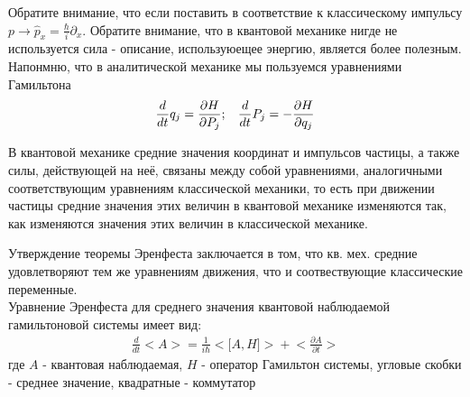 Обратите внимание, что если поставить в соответствие к классическому импульсу $p \rightarrow \widehat{p}_x = \frac{\hbar}{i}\partial_x$. Обратите внимание, что в квантовой механике нигде не используется сила - описание, используюещее энергию, является более полезным.\\
Напонмню, что в аналитической механике мы пользуемся уравнениями Гамильтона
\begin{gather*}
\frac{d}{dt}q_j = \frac{\partial{H}}{\partial{P_j}}; \hspace{3mm} \frac{d}{dt}P_j = -\frac{\partial{H}}{\partial{q_j}}
\end{gather*}
\begin{theorem}
	В квантовой механике средние значения координат и импульсов частицы, а также силы, действующей на неё, связаны между собой уравнениями, аналогичными соответствующим уравнениям классической механики, то есть при движении частицы средние значения этих величин в квантовой механике изменяются так, как изменяются значения этих величин в классической механике.
\end{theorem}
Утверждение теоремы Эренфеста заключается в том, что кв. мех. средние удовлетворяют тем же уравнениям движения, что и соотвествующие классические переменные.\\
Уравнение Эренфеста для среднего значения квантовой наблюдаемой гамильтоновой системы имеет вид:\\
\begin{gather*}
\frac{d}{dt}\big<A\big> = \frac{1}{i\hbar}\big<\big[A,H\big]\big> + \bigg<\frac{\partial{A}}{\partial{t}}\bigg>
\end{gather*}
где $A$ - квантовая наблюдаемая, $H$ - оператор Гамильтон системы, угловые скобки - среднее значение, квадратные - коммутатор
